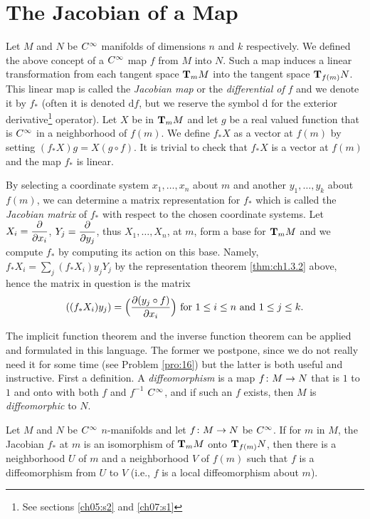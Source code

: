 \documentclass[../main]{subfiles}
\begin{document}

\section{The Jacobian of a Map}\label{ch01:s4}
Let $M$ and $N$ be $\CInfty$ manifolds of dimensions $n$ and $k$ respectively. We defined the above concept of a $\CInfty$ map $f$ from $M$ into $N$. Such a map induces a linear transformation from each tangent space $\tangentspace{M}{m}$ into the tangent space $\tangentspace{N}{f(m)}$. This linear map is called the \emph{Jacobian map} or the \emph{differential of} $f$ and we denote it by $f_{*}$ (often it is denoted $\mathrm{d}f$, but we reserve the symbol $\mathrm{d}$ for the exterior derivative\footnote{See sections \ref{ch05:s2} and \ref{ch07:s1}} operator). Let $X$ be in $\tangentspace{M}{m}$ and let $g$ be a real valued function that is $\CInfty$ in a neighborhood of $f(m)$. We define $f_*X$ as a vector at $f(m)$ by setting $(f_*X)g=X(g\circ f)$. It is trivial to check that $f_*X$ is a vector at $f(m)$ and the map $f_*$ is linear.

By selecting a coordinate system $x_1,\dots,x_n$ about $m$ and another $y_1,\dots,y_k$ about $f(m)$, we can determine a matrix representation for $f_*$ which is called the \emph{Jacobian matrix} of $f_*$ with respect to the chosen coordinate systems. Let $X_i=\pdv{}{x_i}$, $Y_j=\pdv{}{y_j}$, thus $X_1,\dots,X_n$, at $m$, form a base for $\tangentspace{M}{m}$ and we compute $f_*$ by computing its action on this base. Namely, $f_*X_i=\sum\limits_j(f_*X_i)y_jY_j$ by the representation theorem \ref{thm:ch1.3.2} above, hence the matrix in question is the matrix \[((f_*X_i)y_j)=\Big(\pdv{(y_j\circ f)}{x_i}\Big) \text{ for } 1\leq i\leq n \text{ and } 1\leq j\leq k.\]

The implicit function theorem and the inverse function theorem can be applied and formulated in this language. The former we postpone, since we do not really need it for some time (see Problem \ref{pro:16}) but the latter is both useful and instructive. First a definition. A \emph{diffeomorphism} is a map $f\colon M\functionMaps N$ that is $1$ to $1$ and onto with both $f$ and $f^{-1}$ $\CInfty$, and if such an $f$ exists, then $M$ is \emph{diffeomorphic} to $N$.

\begin{theorem}\label{thm:ch1.4.1}
Let $M$ and $N$ be $\CInfty$ $n$-manifolds and let $f\colon M\functionMaps N$ be $\CInfty$. If for $m$ in $M$, the Jacobian $f_*$ at $m$ is an isomorphism of $\tangentspace{M}{m}$ onto $\tangentspace{N}{f(m)}$, then there is a neighborhood $U$ of $m$ and a neighborhood $V$ of $f(m)$ such that $f$ is a diffeomorphism from $U$ to $V$ (i.e., $f$ is a local diffeomorphism about $m$).
\end{theorem}
\end{document}
